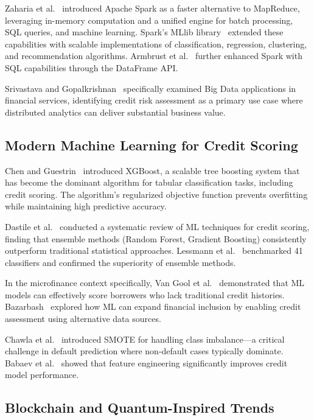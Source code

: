 \documentclass[runningheads]{llncs}
\begin{document}
Zaharia et al.~\cite{zaharia2016spark} introduced Apache Spark as a faster alternative to MapReduce, leveraging in-memory computation and a unified engine for batch processing, SQL queries, and machine learning. Spark's MLlib library~\cite{meng2016mllib} extended these capabilities with scalable implementations of classification, regression, clustering, and recommendation algorithms. Armbrust et al.~\cite{armbrust2015sparksql} further enhanced Spark with SQL capabilities through the DataFrame API.

Srivastava and Gopalkrishnan~\cite{srivastava2015finbda} specifically examined Big Data applications in financial services, identifying credit risk assessment as a primary use case where distributed analytics can deliver substantial business value.

\subsection{Modern Machine Learning for Credit Scoring}

Chen and Guestrin~\cite{chen2016xgboost} introduced XGBoost, a scalable tree boosting system that has become the dominant algorithm for tabular classification tasks, including credit scoring. The algorithm's regularized objective function prevents overfitting while maintaining high predictive accuracy.

Dastile et al.~\cite{dastile2020credit} conducted a systematic review of ML techniques for credit scoring, finding that ensemble methods (Random Forest, Gradient Boosting) consistently outperform traditional statistical approaches. Lessmann et al.~\cite{lessmann2015credit} benchmarked 41 classifiers and confirmed the superiority of ensemble methods.

In the microfinance context specifically, Van Gool et al.~\cite{vangool2012microfinance} demonstrated that ML models can effectively score borrowers who lack traditional credit histories. Bazarbash~\cite{bazarbash2019financial} explored how ML can expand financial inclusion by enabling credit assessment using alternative data sources.

Chawla et al.~\cite{chawla2002smote} introduced SMOTE for handling class imbalance---a critical challenge in default prediction where non-default cases typically dominate. Babaev et al.~\cite{babaev2019features} showed that feature engineering significantly improves credit model performance.

\subsection{Blockchain and Quantum-Inspired Trends}
\end{document}
